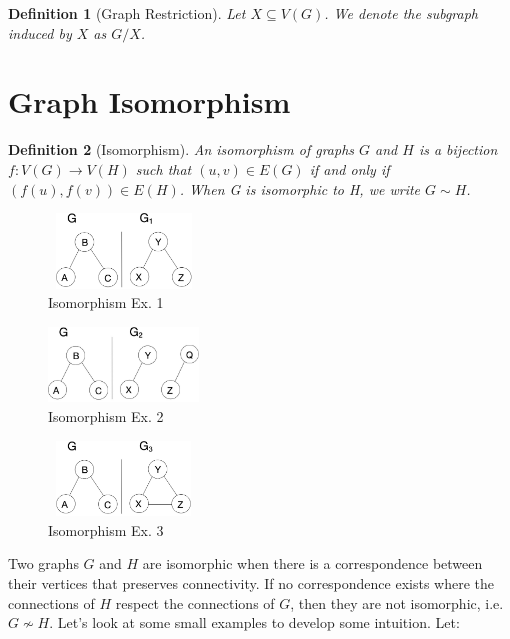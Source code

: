 \documentclass[12pt,twoside]{reedthesis}
\newtheorem{definition}{Definition} %
\begin{document}
\begin{definition} [Graph Restriction]
\label{def:restriction}
Let $X \subseteq V(G)$. We denote the subgraph induced by $X$ as $G/X$.
\end{definition}

\section{Graph Isomorphism}

\begin{definition} [Isomorphism]
\label{def:isomorphism}
An isomorphism of graphs $G$ and $H$ is a bijection $f : V(G) \to V(H)$ such that $(u,v) \in E(G)$ if and only if $(f(u), f(v)) \in E(H)$. When G is isomorphic to H, we write $G \sim H$.
\end{definition}

\begin{figure}[h]
	\centering
	\includegraphics[width=4cm, height=2cm]{iso_1}
	\caption{Isomorphism Ex. 1}
	\label{fig:iso_1}
\end{figure}

\begin{figure}[h]
	\centering
	\includegraphics[width=4cm, height=2cm]{not_iso_2}
	\caption{Isomorphism Ex. 2}
	\label{fig:iso_2}
\end{figure}

\begin{figure}[h]
	\centering
	\includegraphics[width=4cm, height=2cm]{not_iso_3}
	\caption{Isomorphism Ex. 3}
	\label{fig:iso_3}
\end{figure}

Two graphs $G$ and $H$ are isomorphic when there is a correspondence between their vertices that preserves connectivity. If no correspondence exists where the connections of $H$ respect the connections of $G$, then they are not isomorphic, i.e. $G \nsim H$. Let's look at some small examples to develop some intuition. Let:
\end{document}

